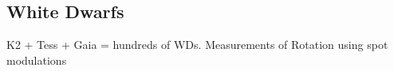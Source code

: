 {\color{red} \subsection{White Dwarfs}}


K2 + Tess + Gaia = hundreds of WDs. Measurements of Rotation using spot modulations